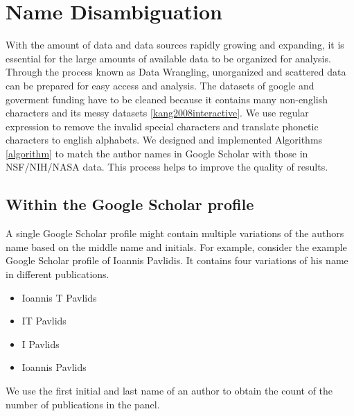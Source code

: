\section{Name Disambiguation}


With the amount of data and data sources rapidly growing and expanding, it is essential for the large amounts of available data to be organized for analysis. Through the process known as Data Wrangling, unorganized and scattered data can be prepared for easy access and analysis. The datasets of google and goverment funding have to be cleaned because it contains many non-english characters and its messy datasets \ref{kang2008interactive}. We use regular expression to remove the invalid special characters and translate phonetic characters to english alphabets. We designed and implemented Algorithms \ref{algorithm} to match the author names in Google Scholar with those in NSF/NIH/NASA data. This process helps to improve the quality of results.


\subsection{Within the Google Scholar profile}

A single Google Scholar profile might contain multiple variations of the authors name based on the middle name and initials. For example, consider the example Google Scholar profile of Ioannis Pavlidis. It contains four variations of his name in different publications.

\begin{itemize}
\item Ioannis T Pavlids
\item IT Pavlids
\item I Pavlids
\item Ioannis Pavlids
\end{itemize}

We use the first initial and last name of an author to obtain the count of the number of publications in the panel.

